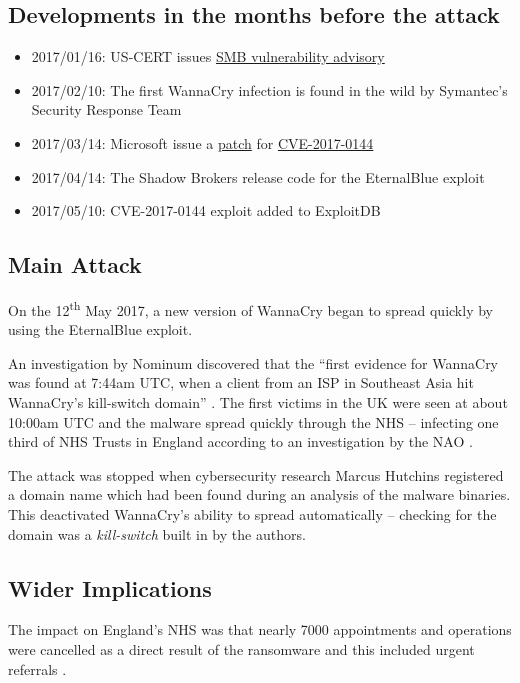 \documentclass[12pt]{article}
\begin{document}
\subsection{Developments in the months before the attack}
\begin{itemize}
  \item 2017/01/16: US-CERT issues \href{https://www.us-cert.gov/ncas/current-activity/2017/01/16/SMB-Security-Best-Practices}{SMB vulnerability advisory}
  \item 2017/02/10: The first WannaCry infection is found in the wild by Symantec's Security Response Team \citep[May 22\textsuperscript{nd}]{blog:symantec:wannacry-lazarus:20170622}
  \item 2017/03/14: Microsoft issue a \href{https://technet.microsoft.com/en-us/library/security/ms17-010.aspx}{patch} for \href{https://www.cve.mitre.org/cgi-bin/cvename.cgi?name=CVE-2017-0144}{CVE-2017-0144}
  \item 2017/04/14: The Shadow Brokers release code for the EternalBlue exploit
  \item 2017/05/10: CVE-2017-0144 exploit added to ExploitDB
\end{itemize}
\subsection{Main Attack}
On the 12\textsuperscript{th} May 2017, a new version of WannaCry began to spread quickly by using the EternalBlue exploit.

An investigation by Nominum discovered that the ``first evidence for WannaCry was found at 7:44am UTC, when a client from an ISP in Southeast Asia hit WannaCry’s kill-switch domain'' \citep[May 15\textsuperscript{th}]{blog:nominum:wannacry-dns:20170615}. The first victims in the UK were seen at about 10:00am UTC and the malware spread quickly through the NHS -- infecting one third of NHS Trusts in England according to an investigation by the NAO \citep[October 27\textsuperscript{th}]{site:nao:wannacry-nhs:20171027}.

The attack was stopped when cybersecurity research Marcus Hutchins registered a domain name which had been found during an analysis of the malware binaries. This deactivated WannaCry's ability to spread automatically -- checking for the domain was a \textit{kill-switch} built in by the authors.

\subsection{Wider Implications}
The impact on England's NHS was that nearly 7000 appointments and operations were cancelled as a direct result of the ransomware and this included urgent referrals \citep[October 27\textsuperscript{th}]{site:nao:wannacry-nhs:20171027}.
\end{document}
